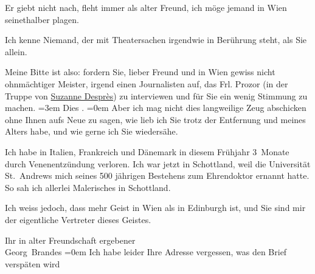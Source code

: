 \pstart
           Er giebt nicht nach, fleht immer als alter Freund, ich möge jemand in Wien seinet{\pb}halber plagen.\pend
           
\pstart
           Ich kenne Niemand, der mit Theatersachen irgendwie in Berührung steht, als Sie
               allein.\pend
           
\pstart
           Meine Bitte ist also: fordern Sie, lieber Freund und in Wien gewiss nicht ohnmächtiger Meister, irgend einen Journalisten auf, das
               Frl. Prozor (in der Truppe von \uline{Suzanne Desprès}) zu interviewen und für Sie ein wenig Stimmung zu machen.\pend
           \leftskip=3em{}
\pstart
           \noindent{}Dies \label{K_L02033-2v}\label{K_L02033-2}.\pend
           \leftskip=0em{}
\pstart
           Aber ich mag nicht dies langweilige Zeug abschicken ohne Ihnen aufs Neue zu sagen,
               wie lieb ich Sie trotz der Entfernung und meines Alters habe, und wie gerne ich Sie
               wiedersähe.\pend
           
\pstart
           Ich habe in Italien, Frankreich und Dänemark in
               diesem Frühjahr 3 Monate durch Venenentzündung verloren. Ich war jetzt in {\pb}Schottland, weil die Universität St. Andrews mich \label{K_L02033-3v}\label{K_L02033-3} seines 500 jährigen Bestehens zum Ehrendoktor
               ernannt hatte. So sah ich allerlei Malerisches in Schottland.\pend
           
\pstart
           Ich weiss jedoch, dass mehr Geist in Wien als in
                  Edinburgh ist, und Sie sind mir der
               eigentliche Vertreter dieses Geistes.\pend
           
\pstart
           Ihr in alter Freundschaft ergebener{\\[\baselineskip]}\spacefill\mbox{Georg Brandes}\pend
           \leftskip=0em{}
\pstart
           \noindent{}Ich habe leider Ihre Adresse vergessen, was den Brief verspäten wird\pend
           \endnumbering{}  
      